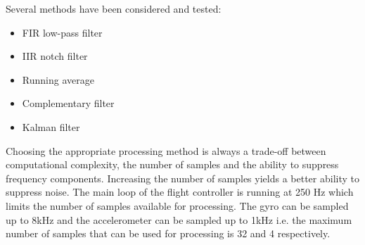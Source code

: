Several methods have been considered and tested:
\begin{itemize}
    \item FIR low-pass filter
    \item IIR notch filter
    \item Running average
    \item Complementary filter  %
    \item Kalman filter         %
\end{itemize}
Choosing the appropriate processing method is always a trade-off between computational complexity, the number of samples and the ability to suppress frequency components. Increasing the number of samples yields a better ability to suppress noise. The main loop of the flight controller is running at 250 Hz which limits the number of samples available for processing. The gyro can be sampled up to 8kHz and the accelerometer can be sampled up to 1kHz i.e. the maximum number of samples that can be used for processing is 32 and 4 respectively.
